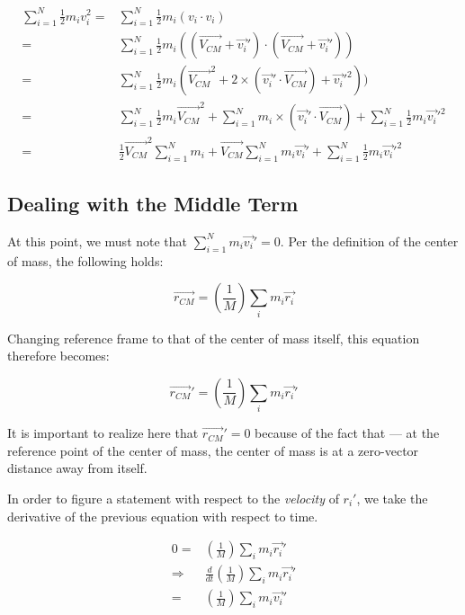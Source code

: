 \documentclass[letterpaper]{article}
\begin{document}
\begin{align}
    \sum^N_{i=1} \frac{1}{2}m_iv_i^2 =& \sum^N_{i=1} \frac{1}{2}m_i(v_i \cdot v_i) \\
    =& \sum^N_{i=1} \frac{1}{2}m_i((\vec{V_{CM}} + \vec{v_i}') \cdot (\vec{V_{CM}} + \vec{v_i}')) \\
    =& \sum^N_{i=1} \frac{1}{2}m_i(\vec{V_{CM}}^2 + 2 \times (\vec{v_i}' \cdot \vec{V_{CM}}) + \vec{v_i}'^2)) \\
    =& \sum^N_{i=1} \frac{1}{2}m_i\vec{V_{CM}}^2 + \sum^N_{i=1} m_i \times (\vec{v_i}' \cdot \vec{V_{CM}}) + \sum^N_{i=1} \frac{1}{2}m_i\vec{v_i}'^2 \\
    =& \frac{1}{2} \vec{V_{CM}}^2 \sum^N_{i=1} m_i + \vec{V_{CM}} \sum^N_{i=1} m_i \vec{v_i}' + \sum^N_{i=1} \frac{1}{2}m_i\vec{v_i}'^2
\end{align}

\subsection{Dealing with the Middle Term}
\label{sec:org8423353}
At this point, we must note that \(\sum^N_{i=1} m_i \vec{v_i}' = 0\). Per the definition of the center of mass, the following holds:

\begin{equation}
    \vec{r_{CM}} = (\frac{1}{M}) \sum_i m_i \vec{r_i}
\end{equation}

Changing reference frame to that of the center of mass itself, this equation therefore becomes:

\begin{equation}
    \vec{r_{CM}}' = (\frac{1}{M}) \sum_i m_i \vec{r_i}'
\end{equation}

It is important to realize here that \(\vec{r_{CM}}' = 0\) because of the fact that --- at the reference point of the center of mass, the center of mass is at a zero-vector distance away from itself.

In order to figure a statement with respect to the \emph{velocity} of \(r_i'\), we take the derivative of the previous equation with respect to time.

\begin{align}
    0 =& (\frac{1}{M}) \sum_i m_i \vec{r_i}' \\
    \Rightarrow& \frac{d}{dt} (\frac{1}{M}) \sum_i m_i \vec{r_i}' \\
    =& (\frac{1}{M}) \sum_i m_i \vec{v_i}'
\end{align}
\end{document}
